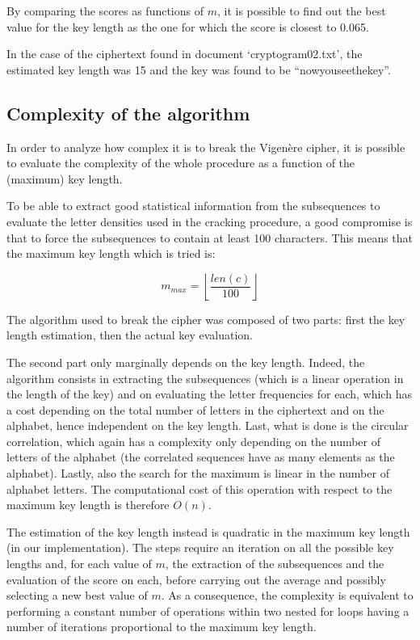 \documentclass[12pt]{article}
\begin{document}
By comparing the scores as functions of $m$, it is possible to find out the best value for the key length as the one for which the score is closest to 0.065.

In the case of the ciphertext found in document `cryptogram02.txt', the estimated key length was 15 and the key was found to be ``nowyouseethekey''.

\subsection{Complexity of the algorithm}

In order to analyze how complex it is to break the Vigenère cipher, it is possible to evaluate the complexity of the whole procedure as a function of the (maximum) key length.

To be able to extract good statistical information from the subsequences to evaluate the letter densities used in the cracking procedure, a good compromise is that to force the subsequences to contain at least 100 characters. This means that the maximum key length which is tried is:

\begin{equation}
  m_{max} = \left\lfloor \frac{len(c)}{100} \right\rfloor
\end{equation}

The algorithm used to break the cipher was composed of two parts: first the key length estimation, then the actual key evaluation.

The second part only marginally depends on the key length. Indeed, the algorithm consists in extracting the subsequences (which is a linear operation in the length of the key) and on evaluating the letter frequencies for each, which has a cost depending on the total number of letters in the ciphertext and on the alphabet, hence independent on the key length.
Last, what is done is the circular correlation, which again has a complexity only depending on the number of letters of the alphabet (the correlated sequences have as many elements as the alphabet). Lastly, also the search for the maximum is linear in the number of alphabet letters.
The computational cost of this operation with respect to the maximum key length is therefore $O(n)$.

The estimation of the key length instead is quadratic in the maximum key length (in our implementation).
The steps require an iteration on all the possible key lengths and, for each value of $m$, the extraction of the subsequences and the evaluation of the score on each, before carrying out the average and possibly selecting a new best value of $m$.
As a consequence, the complexity is equivalent to performing a constant number of operations within two nested for loops having a number of iterations proportional to the maximum key length.
\end{document}
